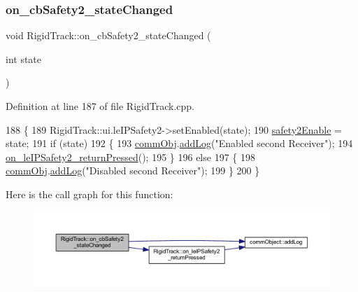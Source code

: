 \subsubsection{\texorpdfstring{on\+\_\+cb\+Safety2\+\_\+state\+Changed}{on\_cbSafety2\_stateChanged}}
{\footnotesize\ttfamily void Rigid\+Track\+::on\+\_\+cb\+Safety2\+\_\+state\+Changed (\begin{DoxyParamCaption}\item[{int}]{state }\end{DoxyParamCaption})\hspace{0.3cm}{\ttfamily [slot]}}



Definition at line 187 of file Rigid\+Track.\+cpp.


\begin{DoxyCode}
188 \{
189     RigidTrack::ui.leIPSafety2->setEnabled(state);
190     \hyperlink{main_8cpp_a436fb814ccc3f02617dade4dc6511143}{safety2Enable} = state;
191     \textcolor{keywordflow}{if} (state)
192     \{
193         \hyperlink{main_8cpp_af29e7fc07ae0979d5fb61b473241d33d}{commObj}.\hyperlink{classcomm_object_aec354c7099b3039083cc4224e071e022}{addLog}(\textcolor{stringliteral}{"Enabled second Receiver"});
194         \hyperlink{class_rigid_track_a555c536593d659b940de43cd2db8d6c1}{on\_leIPSafety2\_returnPressed}();
195     \}
196     \textcolor{keywordflow}{else}
197     \{
198         \hyperlink{main_8cpp_af29e7fc07ae0979d5fb61b473241d33d}{commObj}.\hyperlink{classcomm_object_aec354c7099b3039083cc4224e071e022}{addLog}(\textcolor{stringliteral}{"Disabled second Receiver"});
199     \}
200 \}
\end{DoxyCode}
Here is the call graph for this function\+:
\nopagebreak
\begin{figure}[H]
\begin{center}
\leavevmode
\includegraphics[width=350pt]{class_rigid_track_ad6ba1cfe25f18ff0d9f5993aafa36d16_cgraph}
\end{center}
\end{figure}
\mbox{\label{class_rigid_track_a8f999fa968f4cc9fa548bdc8438b32c4}} 

